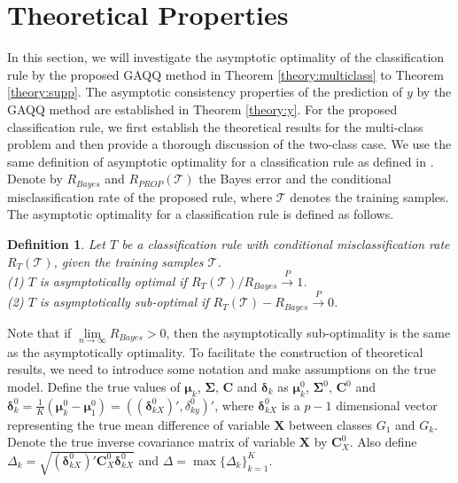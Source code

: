 \documentclass[12pt]{article}
\newtheorem{definition}{Definition}%
\begin{document}
\section{Theoretical Properties}\label{sec:theory}
In this section, we will investigate the asymptotic optimality of the classification rule by the proposed GAQQ method in Theorem \ref{theory:multiclass} to Theorem \ref{theory:supp}.
The asymptotic consistency properties of the prediction of $y$ by the GAQQ method are established in Theorem \ref{theory:y}.
For the proposed classification rule, we first establish the theoretical results for the multi-class problem and then provide a thorough discussion of the two-class case.
We use the same definition of asymptotic optimality for a classification rule as defined in \cite{Shao2011Sparse}.
Denote by $R_{Bayes}$ and $R_{PROP}(\mathcal{T})$ the Bayes error and the conditional misclassification rate of the proposed rule, where $\mathcal{T}$ denotes the training samples.
The asymptotic optimality for a classification rule is defined as follows.
\begin{definition}{}
\noindent Let $T$ be a classification rule with conditional misclassification rate $R_T(\mathcal{T})$,
given the training samples $\mathcal{T}$. \\
(1) $T$ is asymptotically optimal if $R_T(\mathcal{T}) / R_{Bayes} \stackrel{P}{\rightarrow} 1$. \\
(2) $T$ is asymptotically sub-optimal if $R_T(\mathcal{T}) - R_{Bayes} \stackrel{P}{\rightarrow} 0$.
\end{definition}
Note that if $\lim\limits_{n \rightarrow \infty} R_{Bayes} > 0$,
then the asymptotically sub-optimality is the same as the asymptotically optimality.
To facilitate the construction of theoretical results, we need to introduce some notation and make assumptions on the true model.
Define the true values of $\bm \mu_k$, $\bm \Sigma$, $\bm C$ and $\bm \delta_k$ as $\bm \mu_k^0$, $\bm \Sigma^0$, $\bm C^0$ and $\bm \delta_k^0 = \frac{1}{K} (\bm \mu_k^0 - \bm \mu_1^0) = ((\bm \delta_{kX}^0)', \delta_{ky}^0)'$, where $\bm \delta_{kX}^0$ is a $p-1$  dimensional vector representing the true mean difference of variable $\bm X$ between classes $G_1$ and $G_k$.
Denote the true inverse covariance matrix of variable $\bm X$ by $\bm C_X^0$.
Also define $\Delta_k = \sqrt{(\bm \delta_{kX}^0)' \bm C_X^0 \bm \delta_{kX}^0}$ and $\Delta = \max \{ \Delta_k \}_{k=1}^K$.
\end{document}
